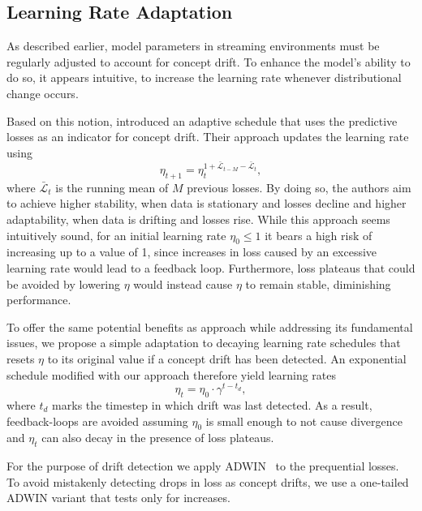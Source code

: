\documentclass[letterpaper]{article} %
\begin{document}
\subsection{Learning Rate Adaptation}

As described earlier, model parameters in streaming environments must be regularly adjusted to account for concept drift.
To enhance the model's ability to do so, it appears intuitive, to increase the learning rate whenever distributional change occurs.

Based on this notion, \citet{kunchevaAdaptiveLearningRate2008} introduced an adaptive schedule that uses the predictive losses as an indicator for concept drift.
Their approach updates the learning rate using
\begin{equation}
	\eta_{t+1} = \eta_t^{1+	\bar{\mathcal{L}}_{t-M} - \bar{\mathcal{L}}_{t}},
\end{equation}\label{eq:kuncheva_lr}
where $\bar{\mathcal{L}}_{t}$ is the running mean of $M$ previous losses.
By doing so, the authors aim to achieve higher stability, when data is stationary and losses decline and higher adaptability, when data is drifting and losses rise.
While this approach seems intuitively sound, for an initial learning rate $\eta_0 \leq 1$ it bears a high risk of increasing up to a value of 1, since increases in loss caused by an excessive learning rate would lead to a feedback loop.
Furthermore, loss plateaus that could be avoided by lowering $\eta$ would instead cause $\eta$ to remain stable, diminishing performance.

To offer the same potential benefits as \citet{kunchevaAdaptiveLearningRate2008} approach while addressing its fundamental issues, we propose a simple adaptation to decaying learning rate schedules that resets $\eta$ to its original value if a concept drift has been detected.
An exponential schedule modified with our approach therefore yield learning rates
\begin{equation}
	\eta_t = \eta_0 \cdot \gamma^{t-t_d},
\end{equation}\label{eq:drift_reset}
where $t_d$ marks the timestep in which drift was last detected.
As a result, feedback-loops are avoided assuming $\eta_0$ is small enough to not cause divergence and $\eta_t$ can also decay in the presence of loss plateaus.

For the purpose of drift detection we apply ADWIN~\cite{bifetLearningTimeChangingData2007} to the prequential losses.
To avoid mistakenly detecting drops in loss as concept drifts, we use a one-tailed ADWIN variant that tests only for increases.
\end{document}
